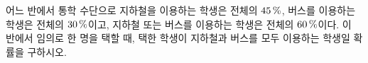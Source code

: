 어느 반에서 통학 수단으로 지하철을 이용하는 학생은 전체의 $45\mkern3mu \%$, 버스를 이용하는 학생은 전체의 $30\mkern3mu \%$이고, 지하철 또는 버스를 이용하는 학생은 전체의 $60\mkern3mu \%$이다. 이 반에서 임의로 한 명을 택할 때, 택한 학생이 지하철과 버스를 모두 이용하는 학생일 확률을 구하시오.
